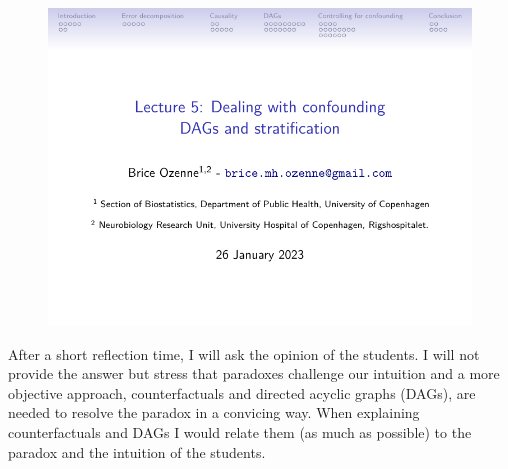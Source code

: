 \documentclass[12pt]{article}
\begin{document}
\begin{figure}[!h]
\centering
\includegraphics[trim={0 0 0 0}, page = 20, width=1\textwidth]{./figures/L5-confounding.pdf}
\label{fig:lmm-slide-wiw}
\end{figure}

After a short reflection time, I will ask the opinion of the
students. I will not provide the answer but stress that paradoxes
challenge our intuition and a more objective approach, counterfactuals
and directed acyclic graphs (DAGs), are needed to resolve the paradox
in a convicing way. When explaining counterfactuals and DAGs I would
relate them (as much as possible) to the paradox and the intuition of
the students.
\end{document}
